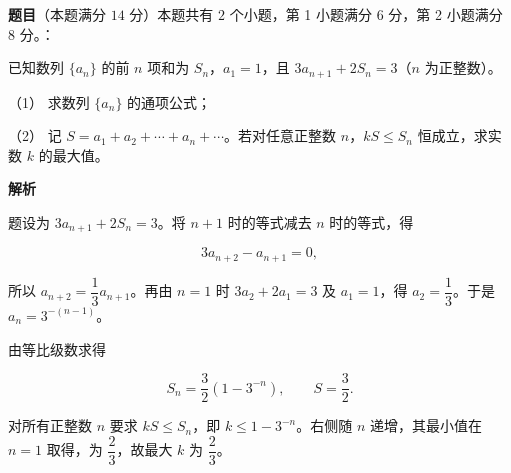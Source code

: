 \begin{answer}

\textbf{题目}（本题满分 $14$ 分）本题共有 $2$ 个小题，第 1 小题满分 $6$ 分，第 2 小题满分 $8$ 分。：

已知数列 $\{a_n\}$ 的前 $n$ 项和为 $S_n$，$a_1=1$，且 $3a_{n+1}+2S_n=3$（$n$ 为正整数）。

（1） 求数列 $\{a_n\}$ 的通项公式；

（2） 记 $S=a_1+a_2+\cdots+a_n+\cdots$。若对任意正整数 $n$，$kS\le S_n$ 恒成立，求实数 $k$ 的最大值。

\textbf{解析}


题设为 $3a_{n+1}+2S_n=3$。将 $n+1$ 时的等式减去 $n$ 时的等式，得

\nopagebreak[4]
\[
3a_{n+2}-a_{n+1}=0,
\]

所以 $a_{n+2}=\dfrac13a_{n+1}$。再由 $n=1$ 时 $3a_2+2a_1=3$ 及 $a_1=1$，得 $a_2=\dfrac13$。于是 $a_n=3^{-(n-1)}$。


由等比级数求得

\nopagebreak[4]
\[
S_n=\frac32(1-3^{-n}),\qquad S=\frac32.
\]

对所有正整数 $n$ 要求 $kS\le S_n$，即 $k\le1-3^{-n}$。右侧随 $n$ 递增，其最小值在 $n=1$ 取得，为 $\dfrac23$，故最大 $k$ 为 $\dfrac23$。



\end{answer}
